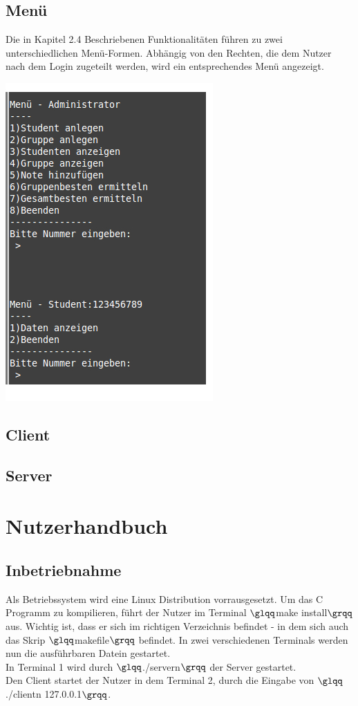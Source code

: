 \documentclass{scrartcl}
\begin{document}
	\subsection{Menü}
		Die in Kapitel 2.4 Beschriebenen Funktionalitäten führen zu zwei unterschiedlichen Menü-Formen. Abhängig von den Rechten, die dem Nutzer nach dem Login zugeteilt werden, wird ein entsprechendes Menü angezeigt.
		\begin{center}
		\includegraphics[scale=0.6]{menue.jpg}
		\end{center}
	\subsection{Client}

	\subsection{Server}

\section{Nutzerhandbuch}
	\subsection{Inbetriebnahme}
		Als Betriebssystem wird eine Linux Distribution vorrausgesetzt. Um das C Programm zu kompilieren, führt der Nutzer im Terminal $\glqq$make install$\grqq$ aus. Wichtig ist, dass er sich im richtigen Verzeichnis befindet - in dem sich auch das Skrip $\glqq$makefile$\grqq$ befindet. In zwei verschiedenen Terminals werden nun die ausführbaren Datein gestartet.\\
		In Terminal 1 wird durch $\glqq$./servern$\grqq$ der Server gestartet.\\
		Den Client startet der Nutzer in dem Terminal 2, durch die Eingabe von $\glqq$./clientn 127.0.0.1$\grqq$.
\end{document}
